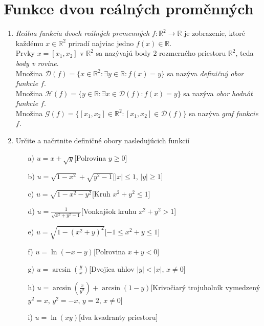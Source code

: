 \section{Funkce dvou reálných proměnných}

\begin{enumerate}

\item \textit{Reálna funkcia dvoch reálných premenných} $f:\mathbb{R}^2 \to \mathbb{R}$ je zobrazenie, ktoré každému $x \in \mathbb{R}^2$ priradí najviac jedno $f(x) \in \mathbb{R}$. \\
Prvky $x=[x_1,x_2]$ v $\mathbb{R}^2$ sa nazývajú body $2$-rozmerného priestoru $\mathbb{R}^2$, teda \textit{body v rovine}.  \\
Množina $\mathcal{D}(f)=\{x \in \mathbb{R}^2: \exists y \in \mathbb{R}: f(x)=y\}$ sa nazýva \textit{definičný obor funkcie $f$}.\\
Množina $\mathcal{H}(f)=\{y \in \mathbb{R}: \exists x \in \mathcal{D}(f): f(x)=y\}$ sa nazýva \textit{obor hodnôt funkcie $f$}.\\
Množina $\mathcal{G}(f)=\{[x_1,x_2] \in \mathbb{R}^2: [x_1,x_2] \in \mathcal{D}(f)\}$ sa nazýva \textit{graf funkcie $f$}.


\item Určite a načrtnite definičné obory nasledujúcich funkcií

\begin{enumerate}
\item[a)]{$u=x+\sqrt{y}$}\hspace{\fill}[Polrovina $y\geq0$]
\item[b)]{$u=\sqrt{1-x^2}+\sqrt{y^2-1}$}\hspace{\fill}[$|x|\leq 1$, $|y|\geq 1$]
\item[c)]{$u=\sqrt{1-x^2-y^2}$}\hspace{\fill}[Kruh $x^2+y^2 \leq 1$]
\item[d)]{$u=\frac{1}{\sqrt{x^2+y^2-1}}$}\hspace{\fill}[Vonkajšok kruhu $x^2+y^2>1$]
\item[e)]{$u=\sqrt{1-(x^2+y)^2}$}\hspace{\fill}[$-1\leq x^2+y \leq 1$]
\item[f)]{$u=\ln(-x-y)$}\hspace{\fill}[Polrovina $x+y < 0$]
\item[g)]{$u=\arcsin(\frac{y}{x})$}\hspace{\fill}[Dvojica uhlov $|y|<|x|$, $x\neq 0$]
\item[h)]{$u=\arcsin(\frac{x}{y^2})+\arcsin(1-y)$}\hspace{\fill}[Krivočiarý trojuholník vymedzený $y^2=x$, $y^2=-x$, $y=2$, $x \neq 0$]
\item[i)]{$u=\ln(xy)$}\hspace{\fill}[dva kvadranty priestoru]
\end{enumerate}


\end{enumerate}
